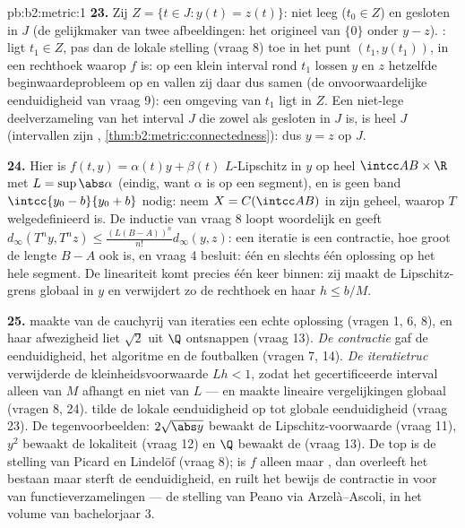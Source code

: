\begin{solution}{pb:b2:metric:1}
\textbf{23.} Zij $Z = \{t \in J : y(t) = z(t)\}$: niet leeg ($t_0
\in Z$) en gesloten in $J$ (de gelijkmaker van twee 
afbeeldingen: het origineel van $\{0\}$ onder $y - z$). : ligt
$t_1 \in Z$, pas dan de lokale stelling (vraag 8) toe in het punt
$(t_1, y(t_1))$, in een rechthoek waarop $f$  is: op een
klein interval rond $t_1$ lossen $y$ en $z$ hetzelfde
beginwaardeprobleem op en vallen zij daar dus samen (de
onvoorwaardelijke eenduidigheid van vraag 9): een omgeving van
$t_1$ ligt in $Z$. Een niet-lege deelverzameling van het interval
$J$ die zowel  als gesloten in $J$ is, is heel $J$ (intervallen
zijn , \cref{thm:b2:metric:connectedness}): dus $y = z$
op $J$.

\textbf{24.} Hier is $f(t, y) = \alpha(t)y + \beta(t)$
$L$-Lipschitz in $y$ op heel $\intcc AB \times \R$ met $L =
\sup\abs\alpha$ (eindig, want $\alpha$ is  op een segment),
en is geen band $\intcc{y_0 - b}{y_0 + b}$ nodig: neem $X =
C(\intcc AB)$ in zijn geheel, waarop $T$ welgedefinieerd is. De
inductie van vraag 8 loopt woordelijk en geeft $d_\infty(T^ny,
T^nz) \leq \frac{(L(B - A))^n}{n!}d_\infty(y, z)$: een iteratie is
een contractie, hoe groot de lengte $B - A$ ook is, en vraag 4
besluit: één en slechts één oplossing op het hele segment. De
lineariteit komt precies één keer binnen: zij maakt de
Lipschitz-grens globaal in $y$ en verwijdert zo de rechthoek en
haar $h \leq b/M$.

\textbf{25.} \emph{} maakte van de cauchyrij van
iteraties een echte oplossing (vragen 1, 6, 8), en haar afwezigheid
liet $\sqrt2$ uit $\Q$ ontsnappen (vraag 13). \emph{De contractie}
gaf de eenduidigheid, het algoritme en de foutbalken (vragen 7,
14). \emph{De iteratietruc} verwijderde de kleinheidsvoorwaarde $Lh
< 1$, zodat het gecertificeerde interval alleen van $M$ afhangt en
niet van $L$ --- en maakte lineaire vergelijkingen globaal (vragen
8, 24). \emph{} tilde de lokale eenduidigheid op tot
globale eenduidigheid (vraag 23). De tegenvoorbeelden:
$2\sqrt{\abs y}$ bewaakt de Lipschitz-voorwaarde (vraag 11), $y^2$
bewaakt de lokaliteit (vraag 12) en $\Q$ bewaakt de 
(vraag 13). De top is de stelling van Picard en Lindelöf (vraag 8);
is $f$ alleen maar , dan overleeft het bestaan maar sterft
de eenduidigheid, en ruilt het bewijs de contractie in voor
 van functieverzamelingen --- de stelling van Peano via
Arzelà--Ascoli, in het volume van bachelorjaar 3.
\end{solution}
